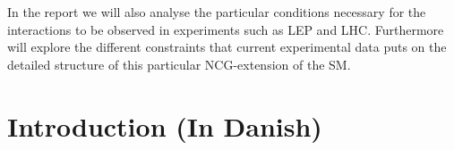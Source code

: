 In the report we will also analyse the particular conditions necessary for the interactions to be observed in experiments such as LEP and LHC. Furthermore will explore the different constraints that current experimental data puts on the detailed structure of this particular NCG-extension of the SM.


\section{Introduction (In Danish)}


